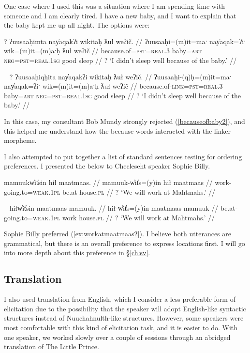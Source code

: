 One case where I used this was a situation where I am spending time with someone and I am clearly tired. I have a new baby, and I want to explain that the baby kept me up all night. The options were:

\ex \label{becauseofbaby1}
\begingl
\glpreamble ? ʔuusaaḥimta nay̓aqakʔi wikitaḥ ƛuł weʔič. //
\gla ʔuusaaḥi=(m)it=maˑ nay̓aqak=ʔiˑ wik=(m)it=(m)aˑḥ ƛuł weʔič //
\glb because.of=\textsc{pst}=\textsc{real.3} baby=\textsc{art} \textsc{neg}=\textsc{pst}=\textsc{real.1sg} good sleep //
\glft ? `I didn't sleep well because of the baby.' //
\endgl
\xe

\ex~ \label{becauseofbaby2}
\begingl
\glpreamble ? ʔuusaaḥiqḥita nay̓aqakʔi wikitaḥ ƛuł weʔič. //
\gla ʔuusaaḥi-(q)ḥ=(m)it=maˑ nay̓aqak=ʔiˑ wik=(m)it=(m)aˑḥ ƛuł weʔič //
\glb because.of-\textsc{link}=\textsc{pst}=\textsc{real.3} baby=\textsc{art} \textsc{neg}=\textsc{pst}=\textsc{real.1sg} good sleep //
\glft ? `I didn't sleep well because of the baby.' //
\endgl
\xe

In this case, my consultant Bob Mundy strongly rejected (\ref{becauseofbaby2}), and this helped me understand how the because words interacted with the linker morpheme.

I also attempted to put together a list of standard sentences testing for ordering preferences. I presented the below to Checleseht speaker Sophie Billy.

\ex \label{ex:workatmaatmaas1}
\begingl
\glpreamble mamuukw̓it̓sin hił maatmaas. //
\gla mamuuk-w̓it̓s=(y)in hił maatmaas //
\glb work-going.to=\textsc{weak.1pl} be.at house.\textsc{pl} //
\glft ? `We will work at Mahtmahs.' //
\endgl
\xe

\ex~ \label{ex:workatmaatmaas2}
\begingl
\glpreamble hiłw̓it̓sin maatmaas mamuuk. //
\gla hił-w̓it̓s=(y)in maatmaas mamuuk //
\glb be.at-going.to=\textsc{weak.1pl} work house.\textsc{pl} //
\glft ? `We will work at Mahtmahs.' //
\endgl
\xe

Sophie Billy preferred (\ref{ex:workatmaatmaas2}). I believe both utterances are grammatical, but there is an overall preference to express locations first. I will go into more depth about this preference in \S\ref{ch:sv}.

\subsection{Translation}

I also used translation from English, which I consider a less preferable form of elicitation due to the possibility that the speaker will adopt English-like syntactic structures instead of Nuuchahnulth-like structures. However, some speakers were most comfortable with this kind of elicitation task, and it is easier to do. With one speaker, we worked slowly over a couple of sessions through an abridged translation of The Little Prince.


